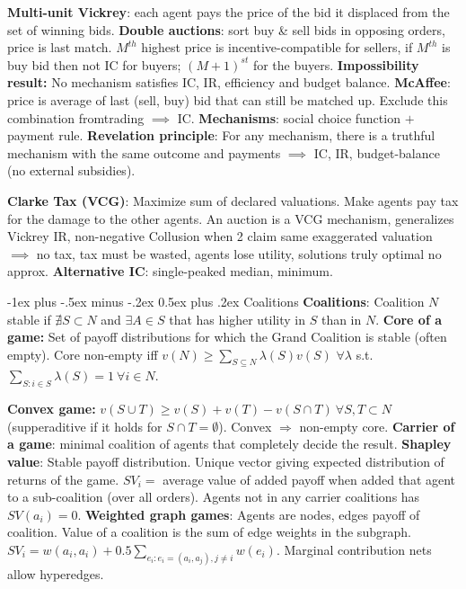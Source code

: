 \documentclass{article}
\makeatletter
\renewcommand{\section}{\@startsection{section}{1}{0mm}%
                                {-1ex plus -.5ex minus -.2ex}%
                                {0.5ex plus .2ex}%
                                {\color{blue}\normalfont\footnotesize\bfseries}}
\newcommand{\disadv}[1]{{\color{red} #1}}
\newcommand{\adv}[1]{{\color{green!60!blue} #1}}
\makeatother
\begin{document}
\begin{multicols*}{4}
\textbf{Multi-unit Vickrey}: each agent pays the price of the bid it displaced from the set of winning bids.
\textbf{Double auctions}: sort buy \& sell bids in opposing orders, price is last match. $M^{th}$ highest price is incentive-compatible for sellers, if $M^{th}$ is buy bid then not IC for buyers; $(M+1)^{st}$ for the buyers.
\textbf{Impossibility result: }No mechanism satisfies IC, IR, efficiency and budget balance.
\textbf{McAffee}: price is average of last (sell, buy) bid that can still be matched up. Exclude this combination fromtrading $\implies$ IC.
\textbf{Mechanisms}: social choice function $+$ payment rule.
\textbf{Revelation principle}: For any mechanism, there is a truthful mechanism with the same outcome and payments $\implies$ IC, IR, budget-balance (no external subsidies).

\textbf{Clarke Tax (VCG)}: Maximize sum of declared valuations. Make agents pay tax for the damage to the other agents. An auction is a VCG mechanism, generalizes Vickrey \adv{IR, non-negative} \disadv{Collusion when 2 claim same exaggerated valuation $\implies$ no tax, tax must be wasted, agents lose utility, solutions truly optimal no approx}.
\textbf{Alternative IC}: single-peaked median, minimum.

\section{Coalitions}
\textbf{Coalitions}: 
Coalition $N$ stable if $\nexists S \subset N$ and $\exists A \in S$ that has higher utility in $S$ than in $N$.
\textbf{Core of a game: }Set of payoff distributions for which the Grand Coalition is stable (often empty). Core non-empty iff $v(N)\geq \sum_{S\subseteq N}\lambda(S)v(S)$ $\forall\lambda$ s.t. $\sum_{S:i\in S}\lambda(S)=1\ \forall i\in N$.

\textbf{Convex game: }$v(S \cup T) \geq v(S) + v(T) - v(S \cap T)\ \forall S,T \subset N$ (supperaditive if it holds for $S\cap T=\emptyset$). Convex $\Rightarrow$ non-empty core. \textbf{Carrier of a game}: minimal coalition of agents that completely decide the result. \textbf{Shapley value}: Stable payoff distribution. Unique vector giving expected distribution of returns of the game. $SV_i = $ average value of added payoff when added that agent to a sub-coalition (over all orders). Agents not in any carrier coalitions has $SV(a_i) = 0$.
\textbf{Weighted graph games}: Agents are nodes, edges payoff of coalition. Value of a coalition is the sum of edge weights in the subgraph. $SV_i=w(a_i,a_i)+0.5\sum_{e_i:e_i=(a_i,a_j),j\neq i}w(e_i)$. Marginal contribution nets allow hyperedges. 


\end{multicols*}
\end{document}
